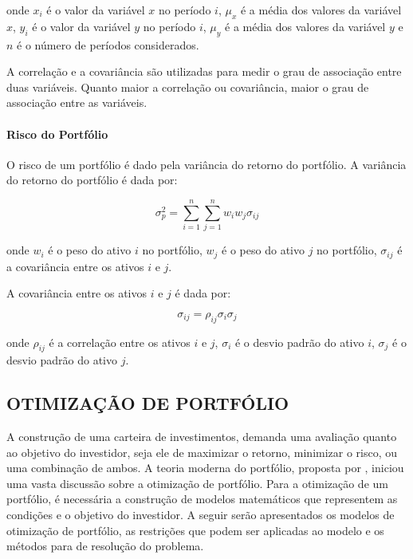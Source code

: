                 \noindent onde $x_i$ é o valor da variável $x$ no período $i$, $\mu_x$ é a média dos valores da variável $x$, $y_i$ é o valor da variável $y$ no período $i$, $\mu_y$ é a média dos valores da variável $y$ e $n$ é o número de períodos considerados.

                \ipar A correlação e a covariância são utilizadas para medir o grau de associação entre duas variáveis. Quanto maior a correlação ou covariância, maior o grau de associação entre as variáveis.

            \paragraph{Risco do Portfólio}

                \ipar O risco de um portfólio é dado pela variância do retorno do portfólio. A variância do retorno do portfólio é dada por:

                \begin{equation}
                    \label{eq:variancia}
                    \sigma_p^2 = \sum_{i=1}^{n} \sum_{j=1}^{n} w_i w_j \sigma_{ij}
                \end{equation}

                \noindent onde $w_i$ é o peso do ativo $i$ no portfólio, $w_j$ é o peso do ativo $j$ no portfólio, $\sigma_{ij}$ é a covariância entre os ativos $i$ e $j$.

                \ipar A covariância entre os ativos $i$ e $j$ é dada por:

                \begin{equation}
                    \label{eq:covariancia}
                    \sigma_{ij} = \rho_{ij} \sigma_i \sigma_j
                \end{equation}

                \noindent onde $\rho_{ij}$ é a correlação entre os ativos $i$ e $j$, $\sigma_i$ é o desvio padrão do ativo $i$, $\sigma_j$ é o desvio padrão do ativo $j$.

    \subsection{OTIMIZAÇÃO DE PORTFÓLIO}
        \label{sec:otimizacao}

        \ipar A construção de uma carteira de investimentos, demanda uma avaliação quanto ao objetivo do investidor, seja ele de maximizar o retorno, minimizar o risco, ou uma combinação de ambos. A teoria moderna do portfólio, proposta por \cite{markowitz1952portfolio}, iniciou uma vasta discussão sobre a otimização de portfólio. Para a otimização de um portfólio, é necessária a construção de modelos matemáticos que representem as condições e o objetivo do investidor. A seguir serão apresentados os modelos de otimização de portfólio, as restrições que podem ser aplicadas ao modelo e os métodos para de resolução do problema.


